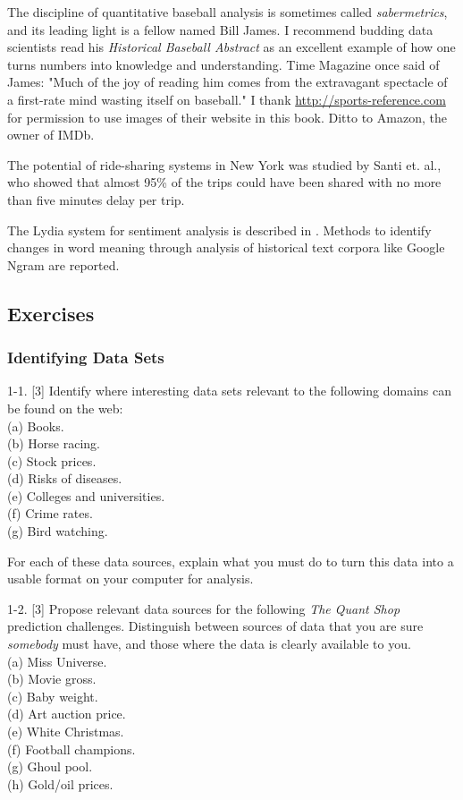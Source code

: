 \documentclass[10pt]{article}
\begin{document}
The discipline of quantitative baseball analysis is sometimes called \emph{sabermetrics}, and its leading light is a fellow named Bill James. I recommend budding data scientists read his \emph{Historical Baseball Abstract} as an excellent example of how one turns numbers into knowledge and understanding. Time Magazine once said of James: "Much of the joy of reading him comes from the extravagant spectacle of a first-rate mind wasting itself on baseball." I thank \href{http://sports-reference.com}{http://sports-reference.com} for permission to use images of their website in this book. Ditto to Amazon, the owner of IMDb.

The potential of ride-sharing systems in New York was studied by Santi et. al., who showed that almost 95\% of the trips could have been shared with no more than five minutes delay per trip.

The Lydia system for sentiment analysis is described in \cite{godbole2007large}. Methods to identify changes in word meaning through analysis of historical text corpora like Google Ngram are reported.

\subsection{Exercises}
\subsubsection{Identifying Data Sets}
1-1. [3] Identify where interesting data sets relevant to the following domains can be found on the web:\\
(a) Books.\\
(b) Horse racing.\\
(c) Stock prices.\\
(d) Risks of diseases.\\
(e) Colleges and universities.\\
(f) Crime rates.\\
(g) Bird watching.

For each of these data sources, explain what you must do to turn this data into a usable format on your computer for analysis.

1-2. [3] Propose relevant data sources for the following \emph{The Quant Shop} prediction challenges. Distinguish between sources of data that you are sure \emph{somebody} must have, and those where the data is clearly available to you.\\
(a) Miss Universe.\\
(b) Movie gross.\\
(c) Baby weight.\\
(d) Art auction price.\\
(e) White Christmas.\\
(f) Football champions.\\
(g) Ghoul pool.\\
(h) Gold/oil prices.
\end{document}
